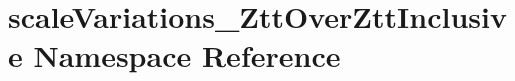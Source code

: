 \hypertarget{namespacescaleVariations__ZttOverZttInclusive}{
\section{scaleVariations\_\-ZttOverZttInclusive Namespace Reference}
\label{namespacescaleVariations__ZttOverZttInclusive}
}
